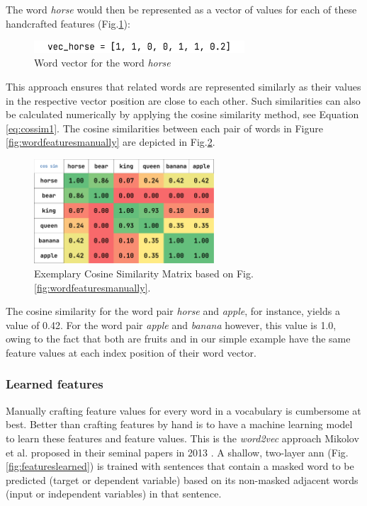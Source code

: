 The word \emph{horse} would then be represented as a vector of values for each of these handcrafted features (Fig.\ref{fig:horsevector}):

\begin{figure}[H]
	\centering
	\includegraphics[width=0.7\textwidth]{Assets/horsevector}
	\caption{Word vector for the word \emph{horse}}
	\label{fig:horsevector}
\end{figure}

This approach ensures that related words are represented similarly as their values in the respective vector position are close to each other.
Such similarities can also be calculated numerically by applying the cosine similarity method, see Equation \ref{eq:cossim1}.
The cosine similarities between each pair of words in Figure \ref{fig:wordfeaturesmanually} are depicted in Fig.\ref{fig:cossimvalues}.

\begin{figure}[H]
	\centering
	\includegraphics[width=0.6\textwidth]{Assets/cossimvalues}
	\caption{Exemplary Cosine Similarity Matrix based on Fig.\ref{fig:wordfeaturesmanually}.}
	\label{fig:cossimvalues}
\end{figure}

The cosine similarity for the word pair \emph{horse} and \emph{apple}, for instance, yields a value of 0.42.
For the word pair \emph{apple} and \emph{banana} however, this value is 1.0, owing to the fact that both are fruits and in our simple example have the same feature values at each index position of their word vector.

\subsubsection{Learned features}
Manually crafting feature values for every word in a vocabulary is cumbersome at best.
Better than crafting features by hand is to have a machine learning model to learn these features and feature values.
This is the \emph{word2vec} approach Mikolov et al. proposed in their seminal papers in 2013 \cite{word2vec1,word2vec2}.
A shallow, two-layer \gls{ann} (Fig.\ref{fig:featureslearned}) is trained with sentences that contain a masked word to be predicted (target or dependent variable) based on its non-masked adjacent words (input or independent variables) in that sentence.

